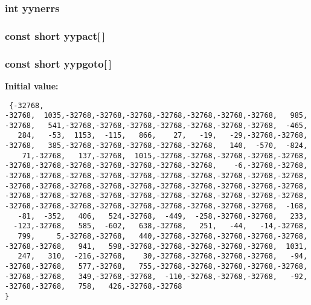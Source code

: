 \subsubsection{\setlength{\rightskip}{0pt plus 5cm}int yynerrs}\label{parser_8c_a203}


\subsubsection{\setlength{\rightskip}{0pt plus 5cm}const short yypact[$\,$]\hspace{0.3cm}{\tt  [static]}}\label{parser_8c_a196}


\subsubsection{\setlength{\rightskip}{0pt plus 5cm}const short yypgoto[$\,$]\hspace{0.3cm}{\tt  [static]}}\label{parser_8c_a197}


{\bf Initial value:}

\footnotesize\begin{verbatim} {-32768,
-32768,  1035,-32768,-32768,-32768,-32768,-32768,-32768,-32768,   985,
-32768,   541,-32768,-32768,-32768,-32768,-32768,-32768,-32768,  -465,
   284,   -53,  1153,  -115,   866,    27,   -19,   -29,-32768,-32768,
-32768,   385,-32768,-32768,-32768,-32768,-32768,   140,  -570,  -824,
    71,-32768,   137,-32768,  1015,-32768,-32768,-32768,-32768,-32768,
-32768,-32768,-32768,-32768,-32768,-32768,-32768,    -6,-32768,-32768,
-32768,-32768,-32768,-32768,-32768,-32768,-32768,-32768,-32768,-32768,
-32768,-32768,-32768,-32768,-32768,-32768,-32768,-32768,-32768,-32768,
-32768,-32768,-32768,-32768,-32768,-32768,-32768,-32768,-32768,-32768,
-32768,-32768,-32768,-32768,-32768,-32768,-32768,-32768,-32768,  -168,
   -81,  -352,   406,   524,-32768,  -449,  -258,-32768,-32768,   233,
  -123,-32768,   585,  -602,   638,-32768,   251,   -44,   -14,-32768,
   799,     5,-32768,-32768,   440,-32768,-32768,-32768,-32768,-32768,
-32768,-32768,   941,   598,-32768,-32768,-32768,-32768,-32768,  1031,
   247,   310,  -216,-32768,    30,-32768,-32768,-32768,-32768,   -94,
-32768,-32768,   577,-32768,   755,-32768,-32768,-32768,-32768,-32768,
-32768,-32768,   349,-32768,-32768,  -110,-32768,-32768,-32768,   -92,
-32768,-32768,   758,   426,-32768,-32768
}\end{verbatim}\normalsize 
{}
